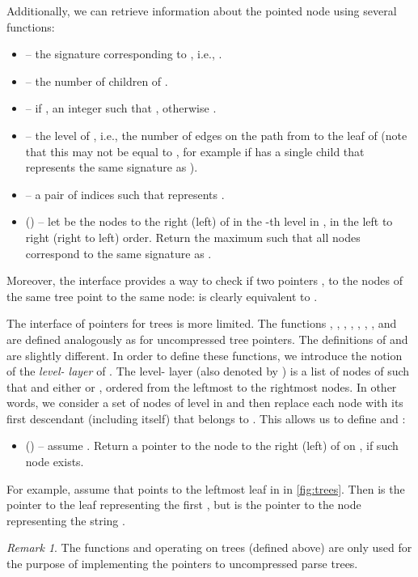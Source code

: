 \documentclass[a4paper]{article}
\theoremstyle{remark}
\newtheorem{remark}[theorem]{Remark}
\begin{document}
Additionally, we can retrieve information about the pointed node  using several functions:
\begin{itemize}
  \item  -- the signature corresponding to , i.e., .
  \item  -- the number of children of .
  \item  -- if , an integer  such that , otherwise .
  \item  -- the level of , i.e., the number of edges on the path from  to the leaf of  (note that this may not be equal to , for example if  has a single child that represents the same signature as ).
  \item  -- a pair of indices  such that  represents .
  \item  () -- let  be the nodes to the right (left) of 
    in the -th level in , in the left to right (right to left) order.
    Return the maximum  such that
    all nodes  correspond to the same signature as .
\end{itemize}

Moreover, the interface provides a way to check if two pointers ,  to
the nodes of the same tree  point to the same node:
 is clearly equivalent to .

The interface of pointers for trees  is more limited.
The functions , , , , ,
, ,  and  are defined
analogously as for uncompressed tree pointers.
The definitions of  and  are slightly different.
In order to define these functions, we introduce the notion of
the \emph{level- layer} of .
The level- layer  (also denoted by )
is a list of nodes  of  such that 
and either  or , ordered from the leftmost to the rightmost nodes.
In other words, we consider a set of nodes of level  in  and then replace each node with its first descendant (including itself) that belongs to .
This allows us to define  and :
\begin{itemize}
  \item  () -- assume .
    Return a pointer to the node to the right (left) of  on , if such node exists.
\end{itemize}
For example, assume that  points to the leftmost leaf in  in \cref{fig:trees}.
Then  is the pointer to the leaf representing the first , but  is the pointer to the node representing the string .

\begin{remark}The functions  and  operating on  trees
(defined above)
are only used for the purpose of implementing the pointers to uncompressed
parse trees.
\end{remark}
\end{document}
